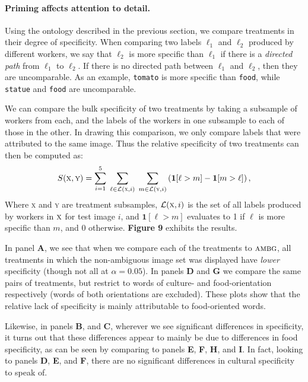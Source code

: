 \documentclass[a4paper]{report}
\begin{document}
\paragraph{Priming affects attention to detail.} Using the ontology described
in the previous section, we compare treatments in their degree of specificity.
When comparing two labels $\ell_1$ and $\ell_2$ produced by different workers,
we say that $\ell_2$ is more specific than $\ell_1$ if there is a 
\textit{directed path} from $\ell_1$ to $\ell_2$.  If there is no directed path
between $\ell_1$ and $\ell_2$, then they are uncomparable.  As an example,
\texttt{tomato} is more specific than \texttt{food}, while \texttt{statue}
and \texttt{food} are uncomparable.

We can compare the bulk specificity of two treatments by taking a subsample
of workers from each, and the labels of the workers in one
subsample to each of those in the other.  In drawing this comparison, we only 
compare labels that were attributed to the same image.  Thus the relative 
specificity of two treatments can then be computed as:
\begin{align}
	S(\textsc{x},\textsc{y}) = 
		\sum_{i=1}^5 \; 
		\sum_{\ell\in \mathcal{L}(\textsc{x},i)} \;
		\sum_{m\in \mathcal{L}
		(\textsc{y},i)} \left(\mathbf{1}[\ell > m] 
		- \mathbf{1}[m>\ell]\right),
\end{align}
Where \textsc{x} and \textsc{y} are treatment subsamples,
$\mathcal{L}(\textsc{x},i)$ is the set of all labels produced by workers in 
$\textsc{x}$ for test image $i$, and $\mathbf{1}[\ell > m]$ evaluates to 1 if 
$\ell$ is more specific than $m$, and 0 otherwise.  \textbf{Figure 9} 
exhibits the results.

In panel \textbf{A}, we see that when we compare each of the treatments to
$\textsc{ambg}$, all treatments in which the non-ambiguous image set was 
displayed have \textit{lower} specificity (though not all at $\alpha=0.05$).  
In panels \textbf{D} and \textbf{G} we compare the same pairs of treatments, 
but restrict to words of culture- and food-orientation respectively (words
of both orientations are excluded).  These plots show that the relative lack of specificity is mainly attributable to food-oriented words.  

Likewise, in panels \textbf{B}, and \textbf{C}, 
wherever we see significant differences in specificity, it turns out that
these differences appear to mainly be due to differences in food specificity,
as can be seen by comparing to panels \textbf{E}, \textbf{F}, \textbf{H}, and 
\textbf{I}.  In fact, looking to panels \textbf{D}, \textbf{E}, and \textbf{F},
there are no significant differences in cultural specificity to speak of. 
\end{document}
